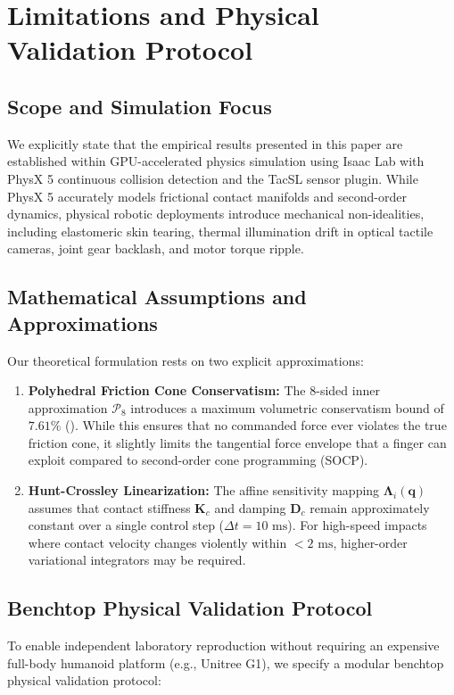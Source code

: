 \section{Limitations and Physical Validation Protocol}
\label{sec:limitations}

\subsection{Scope and Simulation Focus}
We explicitly state that the empirical results presented in this paper are established within GPU-accelerated physics simulation using Isaac Lab with PhysX 5 continuous collision detection and the TacSL sensor plugin. While PhysX 5 accurately models frictional contact manifolds and second-order dynamics, physical robotic deployments introduce mechanical non-idealities, including elastomeric skin tearing, thermal illumination drift in optical tactile cameras, joint gear backlash, and motor torque ripple.

\subsection{Mathematical Assumptions and Approximations}
Our theoretical formulation rests on two explicit approximations:
\begin{enumerate}
    \item \textbf{Polyhedral Friction Cone Conservatism:} The 8-sided inner approximation $\mathcal{P}_8$ introduces a maximum volumetric conservatism bound of $7.61\%$ (). While this ensures that no commanded force ever violates the true friction cone, it slightly limits the tangential force envelope that a finger can exploit compared to second-order cone programming (SOCP).
    \item \textbf{Hunt-Crossley Linearization:} The affine sensitivity mapping $\mathbf{\Lambda}_i(\mathbf{q})$ assumes that contact stiffness $\mathbf{K}_c$ and damping $\mathbf{D}_c$ remain approximately constant over a single control step ($\Delta t = 10\text{ ms}$). For high-speed impacts where contact velocity changes violently within $< 2\text{ ms}$, higher-order variational integrators may be required.
\end{enumerate}

\subsection{Benchtop Physical Validation Protocol}
To enable independent laboratory reproduction without requiring an expensive full-body humanoid platform (e.g., Unitree G1), we specify a modular benchtop physical validation protocol:

